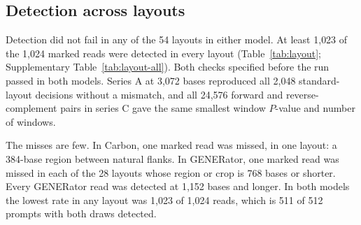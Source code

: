 \documentclass[10pt,twocolumn]{article}
\begin{document}
\subsection{Detection across layouts}
\label{sec:layouts}

Detection did not fail in any of the 54 layouts in either model. At least 1{,}023 of the 1{,}024
marked reads were detected in every layout (Table~\ref{tab:layout}; Supplementary
Table~\ref{tab:layout-all}). Both checks specified before the run passed in both models. Series A at
3{,}072 bases reproduced all 2{,}048 standard-layout decisions without a mismatch, and all 24{,}576
forward and reverse-complement pairs in series C gave the same smallest window $P$-value and number
of windows.

\begin{table}[tp]
\centering
\caption{Detection across layouts in the local cohort, for representative layouts. For each model,
\textit{Reads} are marked reads detected (of 1{,}024, from 512 prompts with two draws),
\textit{Prompts} are prompts with both draws detected (of 512), \textit{Strength} is the median
strength of the best window before the correction for the search, and \textit{Ordinary} is the
number of ordinary reads flagged (of 1{,}024). In series A the region follows the prompt, in series
B it lies between natural flanks in a 6{,}144-base read, and in series D the region length is given
before a plus sign and the flank on each side after it; in series F the read is a random crop of
the standard read. Lengths are in bases. Regions of 576 and 1{,}152 bases fall between window
lengths. Supplementary Table~\ref{tab:layout-all} lists all 54 layouts.}
\label{tab:layout}
\small
\setlength{\tabcolsep}{4pt}
\renewcommand{\arraystretch}{1.08}

\end{table}

The misses are few. In Carbon, one marked read was
missed, in one layout: a 384-base region between natural flanks. In GENERator, one marked read was
missed in each of the 28 layouts whose region or crop is 768 bases or shorter. Every GENERator read
was detected at 1{,}152 bases and longer. In both models the lowest rate in any layout was 1{,}023
of 1{,}024 reads, which is 511 of 512 prompts with both draws detected.
\end{document}
